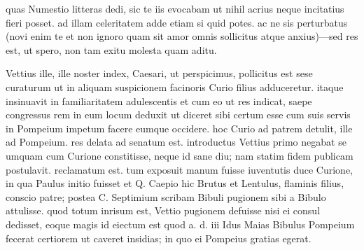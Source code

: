 


 quas Numestio litteras dedi, sic te iis evocabam ut nihil acrius neque incitatius fieri posset. ad illam celeritatem adde etiam si quid potes. ac ne sis perturbatus (novi enim te et non ignoro quam sit amor omnis sollicitus atque anxius)—sed res est, ut spero, non tam exitu molesta quam aditu.

 Vettius ille, ille noster index, Caesari, ut perspicimus, pollicitus est sese curaturum ut in aliquam suspicionem facinoris Curio filius adduceretur. itaque insinuavit in familiaritatem adulescentis et cum eo ut res indicat, saepe congressus rem in eum locum deduxit ut diceret sibi certum esse cum suis servis in Pompeium impetum facere eumque occidere. hoc Curio ad patrem detulit, ille ad Pompeium. res delata ad senatum est. introductus Vettius primo negabat se umquam cum Curione constitisse, neque id sane diu; nam statim fidem publicam postulavit. reclamatum est. tum exposuit manum fuisse iuventutis duce Curione, in qua Paulus initio fuisset et Q. Caepio hic Brutus et Lentulus, flaminis filius, conscio patre; postea C. Septimium scribam Bibuli pugionem sibi a Bibulo attulisse. quod totum inrisum est, Vettio pugionem defuisse nisi ei consul dedisset, eoque magis id eiectum est quod a. d. iii Idus Maias Bibulus Pompeium fecerat certiorem ut caveret insidias; in quo ei Pompeius gratias egerat.

